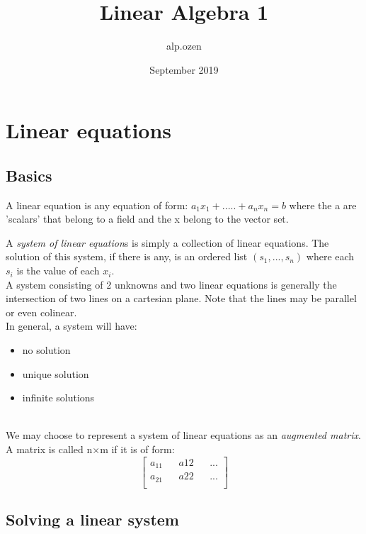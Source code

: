 \documentclass{article}
\title{Linear Algebra 1}
\author{alp.ozen}
\date{September 2019}
\begin{document}
\maketitle

\section{Linear equations}
\subsection{Basics}

\begin{tcolorbox}
A linear equation is any equation of form:
$a_{1}x_{1}+ ..... + a_{n}x_{n} = b$
where the a are 'scalars' that belong to a field and the x belong to the vector set. 
\end{tcolorbox}

A \textit{system of linear equation}s is simply a collection of linear equations. The solution of this system, if there is any, is an ordered list $(s_{1},...,s_{n})$ where each $s_{i}$ is the value of each $x_{i}$.
\\

A system consisting of 2 unknowns and two linear equations is generally the intersection of two lines on a cartesian plane. Note that the lines may be parallel or even colinear. 
\\

In general, a system will have:
\begin{itemize}
    \item no solution
    \item unique solution
    \item infinite solutions 
\end{itemize}
\\

We may choose to represent a system of linear equations as an \textit{augmented matrix}. A matrix is called n$\times$m if it is of form:
\begin{equation*}
    \begin{bmatrix}
    a_{11} && a{12} &&  ... \\
    a_{21} && a {22}  && ... \\
    \end{bmatrix}
\end{equation*}

\subsection{Solving a linear system}
\end{document}
